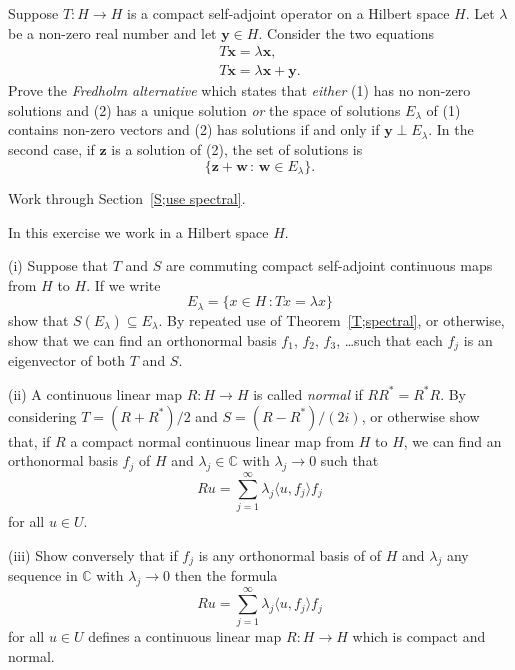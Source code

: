 \begin{exercise}\label{C4.10} Suppose
$T:H\rightarrow H$ is a compact self-adjoint operator
on a Hilbert space $H$.
Let $\lambda$ be a non-zero real number and let 
${\mathbf y}\in H$.
Consider the two equations
\begin{gather*}
T{\mathbf x}=\lambda{\mathbf x},\tag{1}\\
T{\mathbf x}=\lambda{\mathbf x}+{\mathbf y}.\tag{2}
\end{gather*}
Prove the \emph{Fredholm alternative} which states that 
\emph{either} (1) has no non-zero solutions and (2) has
a unique solution \emph{or} the space of solutions
$E_{\lambda}$ of (1) contains non-zero vectors and (2) has solutions
if and only if ${\mathbf y}\perp E_{\lambda}$.
In the second case, if ${\mathbf z}$ is a solution of (2),
the set of solutions is
\[\{{\mathbf z}+{\mathbf w}\,:\,{\mathbf w}\in E_{\lambda}\}.\]

\end{exercise}
\begin{exercise}\label{C4.11} 
Work through Section~\ref{S;use spectral}.
\end{exercise}
\begin{exercise}\label{C4.12}
In this exercise we work in a Hilbert space $H$.

(i) Suppose that $T$ and $S$ are commuting compact self-adjoint
continuous maps from $H$ to $H$. If we write
\[E_{\lambda}=\{x\in H\,:Tx=\lambda x\}\]
show that $S(E_{\lambda})\subseteq E_{\lambda}$. By repeated
use of Theorem~\ref{T;spectral}, or otherwise, show that
we can find an orthonormal basis $f_{1}$, $f_{2}$,
$f_{3}$, \dots such that each
$f_{j}$ is an eigenvector of both $T$ and $S$.

(ii) A continuous linear map $R:H\rightarrow H$ is called \emph{normal}
if $RR^{*}=R^{*}R$. By considering $T=(R+R^{*})/2$
and $S=(R-R^{*})/(2i)$, or otherwise show that,
if $R$ a compact normal continuous linear map
from $H$ to $H$,  we can find
an orthonormal basis $f_{j}$ of $H$ and $\lambda_{j}\in{\mathbb C}$
with $\lambda_{j}\rightarrow 0$ such that
\[Ru=\sum_{j=1}^{\infty}\lambda_{j}\langle u,f_{j}\rangle f_{j}\]
for all $u\in U$.

(iii) Show conversely that if $f_{j}$ is any orthonormal basis 
of of $H$ and $\lambda_{j}$ any sequence in ${\mathbb C}$ with
$\lambda_{j}\rightarrow 0$ then the formula
\[Ru=\sum_{j=1}^{\infty}\lambda_{j}\langle u,f_{j}\rangle f_{j}\]
for all $u\in U$ defines a continuous linear map $R:H\rightarrow H$
which is compact and normal.
\end{exercise} 
